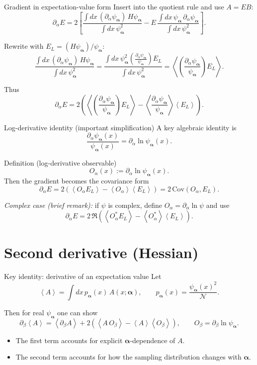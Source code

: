 \documentclass[aspectratio=169]{beamer}
\newcommand{\avg}[1]{\left\langle #1 \right\rangle}
\newcommand{\psia}{\psi_{\bm{\alpha}}}
\newcommand{\El}{E_L}
\newcommand{\Oa}{O_\alpha}
\newcommand{\Ob}{O_\beta}
\begin{document}
\begin{frame}{Gradient in expectation-value form}
Insert into the quotient rule and use $A=EB$:
\[
\partial_\alpha E
=
2\left[
\frac{\int dx\, (\partial_\alpha \psia)\,H\psia}{\int dx\,\psia^2}
-
E\,\frac{\int dx\, \psia\,\partial_\alpha\psia}{\int dx\,\psia^2}
\right].
\]

Rewrite with $\El=(H\psia)/\psia$:
\[
\frac{\int dx\, (\partial_\alpha \psia)\,H\psia}{\int dx\,\psia^2}
=
\frac{\int dx\, \psia^2\left(\frac{\partial_\alpha\psia}{\psia}\right)\El}{\int dx\,\psia^2}
=
\avg{\left(\frac{\partial_\alpha\psia}{\psia}\right)\El}.
\]

Thus
\[
\boxed{
\partial_\alpha E
=
2\left(
\avg{\left(\frac{\partial_\alpha\psia}{\psia}\right)\El}
-\avg{\frac{\partial_\alpha\psia}{\psia}}\avg{\El}
\right).
}
\]
\end{frame}

\begin{frame}{Log-derivative identity (important simplification)}
A key algebraic identity is
\[
\boxed{\frac{\partial_\alpha \psia(x)}{\psia(x)} = \partial_\alpha \ln \psia(x).}
\]

\begin{block}{Definition (log-derivative observable)}
\[
\Oa(x):=\partial_\alpha \ln \psia(x).
\]
Then the gradient becomes the covariance form
\[
\boxed{
\partial_\alpha E = 2\left(\avg{\Oa \El}-\avg{\Oa}\avg{\El}\right)
=2\,\mathrm{Cov}(\Oa,\El).
}
\]
\end{block}

\smallskip
\emph{Complex case (brief remark):} if $\psi$ is complex, define $O_\alpha=\partial_\alpha\ln\psi$ and use
\[
\partial_\alpha E = 2\,\Re\!\left(\avg{O_\alpha^\ast \El}-\avg{O_\alpha^\ast}\avg{\El}\right).
\]
\end{frame}

\section{Second derivative (Hessian)}

\begin{frame}{Key identity: derivative of an expectation value}
Let
\[
\avg{A}=\int dx\, p_{\bm{\alpha}}(x)\,A(x;\bm{\alpha}),
\qquad
p_{\bm{\alpha}}(x)=\frac{\psia(x)^2}{\mathcal{N}}.
\]

Then for real $\psia$ one can show
\[
\boxed{
\partial_\beta \avg{A}
=
\avg{\partial_\beta A}
+2\left(\avg{A\,\Ob}-\avg{A}\avg{\Ob}\right),
}
\qquad
\Ob=\partial_\beta \ln \psia.
\]

\begin{itemize}
\item The first term accounts for explicit $\bm{\alpha}$-dependence of $A$.
\item The second term accounts for how the sampling distribution changes with $\bm{\alpha}$.
\end{itemize}
\end{frame}
\end{document}

